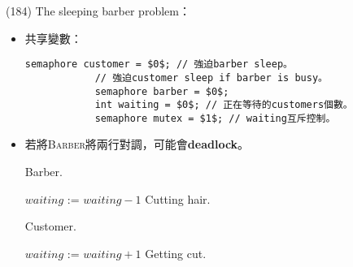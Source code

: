 \begin{theorem}{(184)} The sleeping barber problem：\begin{itemize}
        \item 共享變數：\begin{lstlisting}[caption={Shared variables of The sleeping barber problem.}, captionpos=b, mathescape=true]
            semaphore customer = $0$; // 強迫barber sleep。
            // 強迫customer sleep if barber is busy。
            semaphore barber = $0$; 
            int waiting = $0$; // 正在等待的customers個數。
            semaphore mutex = $1$; // waiting互斥控制。
        \end{lstlisting}
        \item 若將\textsc{Barber}將兩行對調，可能會\textbf{deadlock}。
        \begin{algorithm}[H]
            \caption{Barber.}
            \begin{algorithmic}[1]
                    \Repeat
                        \State {} 
                        \State {}
                        \State $waiting$ := $waiting - 1$
                        \State {} 
                        \State {}
                        \State Cutting hair.
                \EndFunction
            \end{algorithmic}
        \end{algorithm}
        \begin{algorithm}[H]
            \caption{Customer.}
            \begin{algorithmic}[1]
                    \Repeat
                        \State {}
                         
                            \State $waiting$ := $waiting + 1$
                            \State {} 
                            \State {}
                            \State {} 
                            \State Getting cut.
                        \Else
                            \State {}
                        \EndIf
                \EndFunction
            \end{algorithmic}
        \end{algorithm}
    \end{itemize}
\end{theorem}

